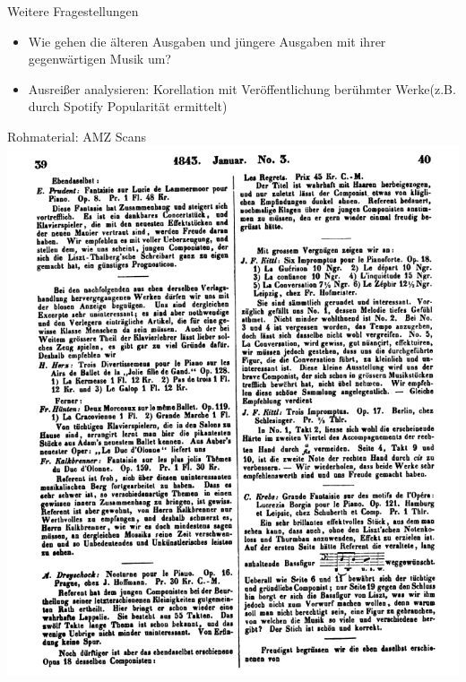 \documentclass{beamer}
\begin{document}
\begin{frame}{Weitere Fragestellungen}
	  	\begin{itemize}
	  		\item Wie gehen die älteren Ausgaben und jüngere Ausgaben mit ihrer gegenwärtigen Musik um?
	  		\item Ausreißer analysieren: Korellation mit  Veröffentlichung berühmter Werke(z.B. durch Spotify Popularität ermittelt)
	  		
	  	\end{itemize}
\end{frame}
\begin{frame}{Rohmaterial: AMZ Scans}
	\includegraphics[scale=.29]{"data/amzscreenshot.png"}
\end{frame}
\end{document}
